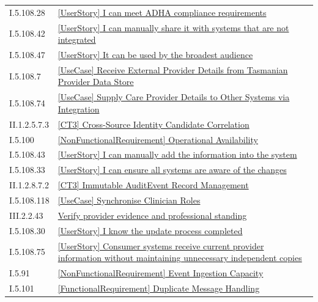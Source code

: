 \begin{longtable}{p{.22\linewidth}p{.73\linewidth}}
I.5.108.28 & \hyperref[element:47cf1575be2443238384f4c9f854a07f]{[UserStory] I can meet ADHA compliance requirements} \\
I.5.108.42 & \hyperref[element:4ed65dba80e944efa6e4ba22772255f9]{[UserStory] I can manually share it with systems that are not integrated} \\
I.5.108.47 & \hyperref[element:548143665c3f4eeca41e9e8270449adf]{[UserStory] It can be used by the broadest audience} \\
I.5.108.7 & \hyperref[element:5ebbd5844cc84555a9c445ffd45c6be5]{[UseCase] Receive External Provider Details from Tasmanian Provider Data Store} \\
I.5.108.74 & \hyperref[element:60d6209f40f346f389106a588a56951d]{[UseCase] Supply Care Provider Details to Other Systems via Integration} \\
II.1.2.5.7.3 & \hyperref[element:60d97cd46fde4349864aa737526f08cb]{[CT3] Cross-Source Identity Candidate Correlation} \\
I.5.100 & \hyperref[element:65ac0367b7f241149ad1839032004039]{[NonFunctionalRequirement] Operational Availability} \\
I.5.108.43 & \hyperref[element:6759ce1c77f3469796606b3f247881ae]{[UserStory] I can manually add the information into the system} \\
I.5.108.33 & \hyperref[element:6dd723b3350146bb84a1c99107750899]{[UserStory] I can ensure all systems are aware of the changes} \\
II.1.2.8.7.2 & \hyperref[element:70e9f760ebd34045b8dd92f31fb8a00b]{[CT3] Immutable AuditEvent Record Management} \\
I.5.108.118 & \hyperref[element:7189a8d8a5574eb5b11dcb1ca680b52e]{[UseCase] Synchronise Clinician Roles} \\
III.2.2.43 & \hyperref[element:733f2f6c9a5e49ceb0107d30bc736945]{Verify provider evidence and professional standing} \\
I.5.108.30 & \hyperref[element:7379a933e1954aaf8b5a05a0eb540e59]{[UserStory] I know the update process completed} \\
I.5.108.75 & \hyperref[element:74592bc03e0c4ef38c991a95155e7d22]{[UserStory] Consumer systems receive current provider information without maintaining unnecessary independent copies} \\
I.5.91 & \hyperref[element:75420022c1a7463e91ca48f229a78194]{[NonFunctionalRequirement] Event Ingestion Capacity} \\
I.5.101 & \hyperref[element:76a67526fcdf40999f375a8cac54d5ef]{[FunctionalRequirement] Duplicate Message Handling} \\

\end{longtable}
